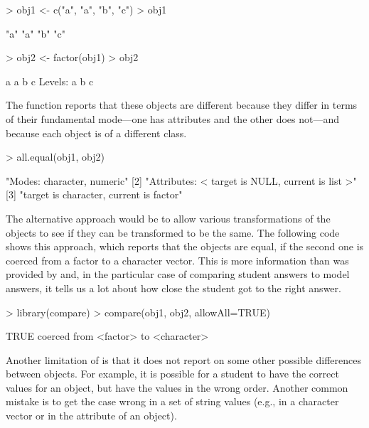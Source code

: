 \begin{Schunk}
\begin{Sinput}
> obj1 <- c("a", "a", "b", "c")
> obj1
\end{Sinput}
\begin{Soutput}
[1] "a" "a" "b" "c"
\end{Soutput}
\end{Schunk}
\begin{Schunk}
\begin{Sinput}
> obj2 <- factor(obj1)
> obj2
\end{Sinput}
\begin{Soutput}
[1] a a b c
Levels: a b c
\end{Soutput}
\end{Schunk}
The  function reports that these objects are different
because they differ in terms of their fundamental mode---one has
attributes and the other does not---and because
each object is of a different class.

\begin{Schunk}
\begin{Sinput}
> all.equal(obj1, obj2)
\end{Sinput}
\end{Schunk}
{\footnotesize
\begin{Schunk}
\begin{Soutput}
[1] "Modes: character, numeric"                      
[2] "Attributes: < target is NULL, current is list >"
[3] "target is character, current is factor"         
\end{Soutput}
\end{Schunk}
} %

The alternative approach would be to allow various transformations of
the objects to see if they can be transformed to be the same.
The following code shows this approach, which reports that the objects
are equal, if the second one is coerced from a factor to a character
vector.  This is more information than was provided by 
and, in the particular case of comparing student answers 
to model answers, it tells us a lot about how close the student
got to the right answer.

\begin{Schunk}
\begin{Sinput}
> library(compare)
> compare(obj1, obj2, allowAll=TRUE)
\end{Sinput}
\begin{Soutput}
TRUE
  coerced from <factor> to <character>
\end{Soutput}
\end{Schunk}
Another limitation of  is that it does not
report on some other possible differences between objects.
For example, it is possible for a student to have the correct values
for an \R{} object,
but have the values in the wrong order.  Another common mistake is to get the
case wrong in a set of string values (e.g., in a character vector
or in the  attribute of an object).

